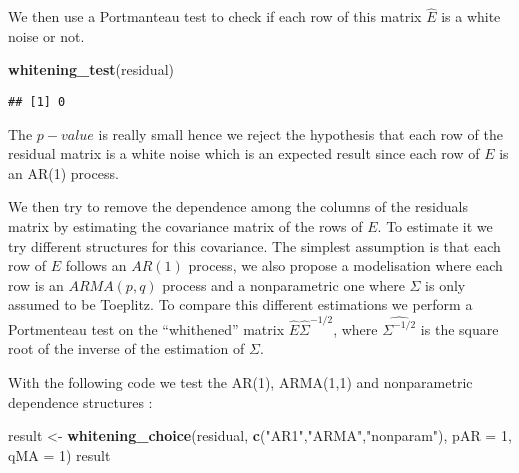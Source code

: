 \documentclass[]{article}
\newenvironment{Shaded}{\begin{snugshade}}{\end{snugshade}}
\newcommand{\KeywordTok}[1]{\textcolor[rgb]{0.13,0.29,0.53}{\textbf{#1}}}
\newcommand{\DataTypeTok}[1]{\textcolor[rgb]{0.13,0.29,0.53}{#1}}
\newcommand{\DecValTok}[1]{\textcolor[rgb]{0.00,0.00,0.81}{#1}}
\newcommand{\StringTok}[1]{\textcolor[rgb]{0.31,0.60,0.02}{#1}}
\newcommand{\OperatorTok}[1]{\textcolor[rgb]{0.81,0.36,0.00}{\textbf{#1}}}
\newcommand{\NormalTok}[1]{#1}
\begin{document}
\begin{Shaded}
\end{Shaded}

We then use a Portmanteau test to check if each row of this matrix
\(\widehat{E}\) is a white noise or not.

\begin{Shaded}
\begin{Highlighting}[]
\KeywordTok{whitening_test}\NormalTok{(residual)}
\end{Highlighting}
\end{Shaded}

\begin{verbatim}
## [1] 0
\end{verbatim}

The \(p-value\) is really small hence we reject the hypothesis that each
row of the residual matrix is a white noise which is an expected result
since each row of \(E\) is an AR(1) process.

We then try to remove the dependence among the columns of the residuals
matrix by estimating the covariance matrix of the rows of \(E\). To
estimate it we try different structures for this covariance. The
simplest assumption is that each row of \(E\) follows an \(AR(1)\)
process, we also propose a modelisation where each row is an
\(ARMA(p,q)\) process and a nonparametric one where \(\Sigma\) is only
assumed to be Toeplitz. To compare this different estimations we perform
a Portmenteau test on the ``whithened'' matrix
\(\widehat{E}\widehat{\Sigma}^{-1/2}\), where \(\hat{\Sigma^{-1/2}}\) is
the square root of the inverse of the estimation of \(\Sigma\).

With the following code we test the AR(1), ARMA(1,1) and nonparametric
dependence structures :

\begin{Shaded}
\begin{Highlighting}[]
\NormalTok{result <-}\StringTok{ }\KeywordTok{whitening_choice}\NormalTok{(residual, }\KeywordTok{c}\NormalTok{(}\StringTok{"AR1"}\NormalTok{,}\StringTok{"ARMA"}\NormalTok{,}\StringTok{"nonparam"}\NormalTok{), }\DataTypeTok{pAR =} \DecValTok{1}\NormalTok{, }\DataTypeTok{qMA =} \DecValTok{1}\NormalTok{)}
\NormalTok{result}
\end{Highlighting}
\end{Shaded}
\end{document}
